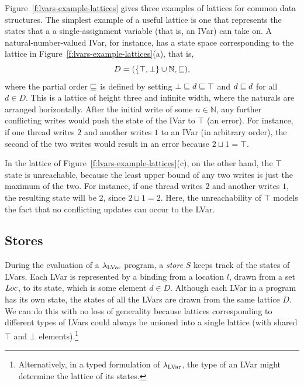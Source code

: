 Figure~\ref{f:lvars-example-lattices} gives three examples of lattices
for common data structures.  The simplest example of a useful
lattice is one that represents the states that a a single-assignment
variable (that is, an IVar) can take on.  A natural-number-valued
IVar, for instance, has a state space corresponding to the lattice in
Figure~\ref{f:lvars-example-lattices}(a), that is,
\begin{displaymath}
  D = (\lbrace \top, \bot \rbrace \cup \mathbb{N}, \sqsubseteq), 
\end{displaymath}
where the partial order $\sqsubseteq$ is defined by setting $\bot
\sqsubseteq d \sqsubseteq \top$ and $d \sqsubseteq d$ for all $d \in D$.  This
is a lattice of height three and infinite width, where the naturals
are arranged horizontally.  After the initial write of some $n \in
\mathbb{N}$, any further conflicting writes would push the state of
the IVar to $\top$ (an error).  For instance, if one thread writes $2$
and another writes $1$ to an IVar (in arbitrary order), the second of
the two writes would result in an error because $2 \sqcup 1 = \top$.

In the lattice of Figure~\ref{f:lvars-example-lattices}(c), on the
other hand, the $\top$ state is unreachable, because the least upper
bound of any two writes is just the maximum of the two.  For instance,
if one thread writes $2$ and another writes $1$, the resulting state
will be $2$, since $2 \sqcup 1 = 2$.  Here, the unreachability of
$\top$ models the fact that no conflicting updates can occur to the
LVar.

\subsection{Stores}\label{subsection:lvars-stores}

During the evaluation of a $\lambda_{\textrm{LVar}}$ program, a \emph{store} $S$
keeps track of the states of LVars.  Each LVar is represented by a
binding from a location $l$, drawn from a set $\mathit{Loc}$, to its state,
which is some element $d \in D$.  Although each LVar in a program has
its own state, the states of all the LVars are drawn from the same
lattice $D$.  We can do this with no loss of generality because
lattices corresponding to different types of LVars could always be
unioned into a single lattice (with shared $\top$ and $\bot$
elements).\footnote{Alternatively, in a typed formulation of
  $\lambda_{\textrm{LVar}}$, the type of an LVar might determine the lattice of
  its states.}

